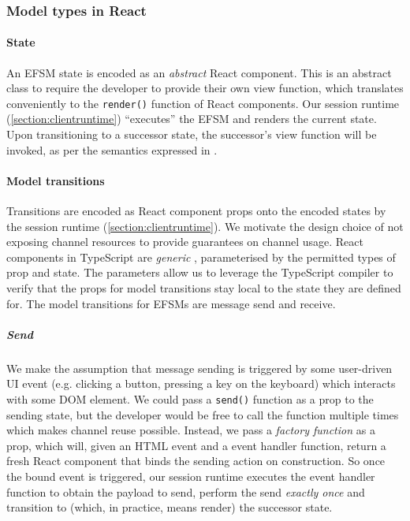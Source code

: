 \subsubsection{Model types in React}

\paragraph{State}
An EFSM state is encoded as an \textit{abstract} React
component.
This is an abstract class to require the developer to provide their
own view function, which translates conveniently to the \texttt{render()}
function of React components.
Our session runtime (\cref{section:clientruntime}) ``executes'' the EFSM and
renders the current state.
Upon transitioning to a successor state, the successor's view function will be
invoked, as per the semantics expressed in \cite{MVU2019}.

\paragraph{Model transitions}
Transitions are encoded as React component props onto the encoded states by the
session runtime (\cref{section:clientruntime}).
We motivate the design choice of not exposing channel resources to provide
guarantees on channel usage.
React components in TypeScript are
\textit{generic} \cite{TypeScriptSpec}, parameterised by the permitted
types of prop and state.
The parameters allow us to leverage the TypeScript compiler to
verify that the props for model transitions stay local to the state they are
defined for.
The model transitions for EFSMs are message send and receive.

\subparagraph{Send}
We make the assumption that message sending is triggered by
some user-driven UI event (e.g. clicking a button, pressing a key on the
keyboard) which interacts with some DOM element.
We could pass a
\texttt{send()} function as a prop to the sending state, but the developer
would be free to call the function multiple times which makes channel reuse
possible.
Instead, we pass a \textit{factory function} as a prop, which will,
given an HTML event and a event handler function, return a fresh React
component that binds the sending action on construction.
So once the bound event is triggered, our session runtime executes the event
handler function to obtain the payload to send, perform the send
\textit{exactly once} and transition to (which, in practice, means render) the
successor state.

